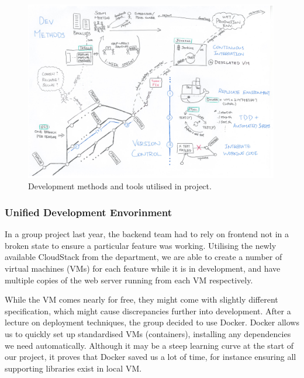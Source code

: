 \documentclass[a4paper, titlepage]{article}
\begin{document}
\begin{figure}[ht]
  \centering
    \includegraphics[width = 0.99\textwidth]{./projman/devtools.pdf}
  \caption{Development methods and tools utilised in project.}
  \label{fig:projman_devtools}
\end{figure}

\subsubsection{Unified Development Envorinment} \label{sec:projman_devenv}


In a group project last year, the backend team had to rely on frontend not in a broken state to ensure a 
particular feature was working. Utilising the newly available CloudStack from the department,
we are able to create a number of virtual machines (VMs) for each feature while it is in development,
and have multiple copies of the web server running from each VM respectively.

While the VM comes nearly for free, they might come with slightly different specification,
which might cause discrepancies further into development. After a lecture on deployment techniques, the group decided to use Docker. Docker allows us to quickly set up standardised VMs (containers), installing any dependencies we need automatically. Although it may be a steep learning curve at the start of our project, it proves that Docker saved us a lot of time, 
for instance ensuring all supporting libraries exist in local VM.
\end{document}
